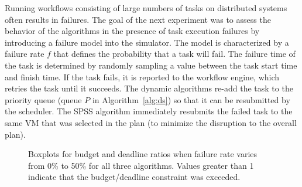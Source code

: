 \documentclass[conference]{IEEEtran}
\begin{document}
Running workflows consisting of large numbers of tasks on distributed systems
often results in failures. The goal of the next experiment was to assess the
behavior of the algorithms in the presence of task execution failures by
introducing a failure model into the simulator. The model is characterized by
a failure rate $f$ that defines the probability that a task will fail. The
failure time of the task is determined by randomly sampling a value between
the task start time and finish time. If the task fails, it is reported to the
workflow engine, which retries the task until it succeeds. The dynamic
algorithms re-add the task to the priority queue (queue $P$ in
Algorithm~\ref{alg:ds}) so that it can be resubmitted by the scheduler. The
SPSS algorithm immediately  resubmits the failed task to the same VM that was
selected in the plan (to minimize the disruption to the overall plan).

\begin{figure}[tb]
    \hspace{2cm}
    \caption{Boxplots for budget and deadline ratios when failure rate varies
    from 0\% to 50\% for all three algorithms. Values greater than 1 indicate 
    that the budget/deadline constraint was exceeded.}
    \label{fig:failures}
\end{figure}
\end{document}
